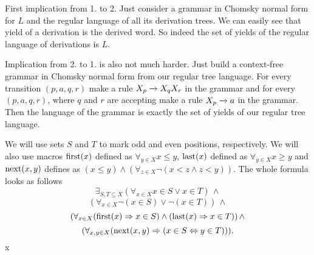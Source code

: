 {
First implication from 1. to 2. Just consider a grammar in Chomsky normal form for $L$ and the regular language
of all its derivation trees. We can easily see that yield of a derivation is the derived word. So indeed the set of yields
of the regular language of derivations is $L$.

Implication from 2. to 1. is also not much harder. Just build a context-free grammar in Chomsky normal form from our regular
tree language. For every transition $(p, a, q, r)$ make a rule $X_p \xrightarrow{} X_q X_r$ in the grammar
and for every $(p, a, q, r)$, where $q$ and $r$ are accepting make a rule $X_p \xrightarrow{} a$ in the grammar.
Then the language of the grammar is exactly the set of yields of our regular tree language.
}




{

}




{
We will use sets $S$ and $T$ to mark odd and even positions, respectively.
We will also use macros $\textup{first}(x)$ defined as $\forall_{y \in X} x \leq y$,
$\textup{last}(x)$ defined as $\forall_{y \in X} x \geq y$ and $\textup{next}(x, y)$ defines as
$(x \leq y) \wedge (\forall_{z \in X} \neg (x < z \wedge z < y))$.
The whole formula looks as follows
\[
\exists_{S, T \subseteq X} (\forall_{x \in X} x \in S \vee x \in T) \, \wedge 
\]
\[
(\forall_{x \in X} \neg (x \in S) \vee \neg (x \in T)) \, \wedge
\]
\[
(\forall_{x \in X} (\textup{first}(x) \Rightarrow x \in S) \wedge (\textup{last}(x) \Rightarrow x \in T)) \, \wedge
\]
\[
(\forall_{x, y \in X} (\textup{next}(x, y) \Rightarrow (x \in S \Leftrightarrow y \in T))).
\]
x
}








